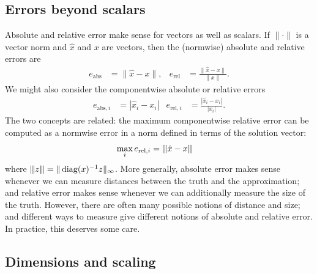 \documentclass[12pt, leqno]{article} %
\begin{document}
\subsection{Errors beyond scalars}

Absolute and relative error make sense for vectors as well as scalars.
If $\| \cdot \|$ is a vector
norm and $\hat{x}$ and $x$ are vectors, then the (normwise) absolute
and relative errors are
\begin{align*}
  e_{\mathrm{abs}} &= \|\hat{x}-x\|, &
  e_{\mathrm{rel}} &= \frac{\|\hat{x}-x\|}{\|x\|}.
\end{align*}
We might also consider the componentwise absolute or relative errors
\begin{align*}
  e_{\mathrm{abs},i} &= |\hat{x}_i-x_i| &
  e_{\mathrm{rel},i} &= \frac{|\hat{x}_i-x_i|}{|x_i|}.
\end{align*}
The two concepts are related: the maximum componentwise relative error
can be computed as a normwise error in a norm defined in terms of the
solution vector:
\begin{align*}
  \max_i e_{\mathrm{rel},i} &= {\left\vert\kern-0.25ex\left\vert\kern-0.25ex\left\vert \hat{x}-x \right\vert\kern-0.25ex\right\vert\kern-0.25ex\right\vert}
\end{align*}
where ${\left\vert\kern-0.25ex\left\vert\kern-0.25ex\left\vert z \right\vert\kern-0.25ex\right\vert\kern-0.25ex\right\vert} = \|\operatorname{diag}(x)^{-1} z\|_\infty$.
More generally, absolute error makes sense whenever we can measure
distances between the truth and the approximation; and relative error
makes sense whenever we can additionally measure the size of the
truth.  However, there are often many possible notions of distance
and size; and different ways to measure give different notions of
absolute and relative error.  In practice, this deserves some care.

\subsection{Dimensions and scaling}
\end{document}
